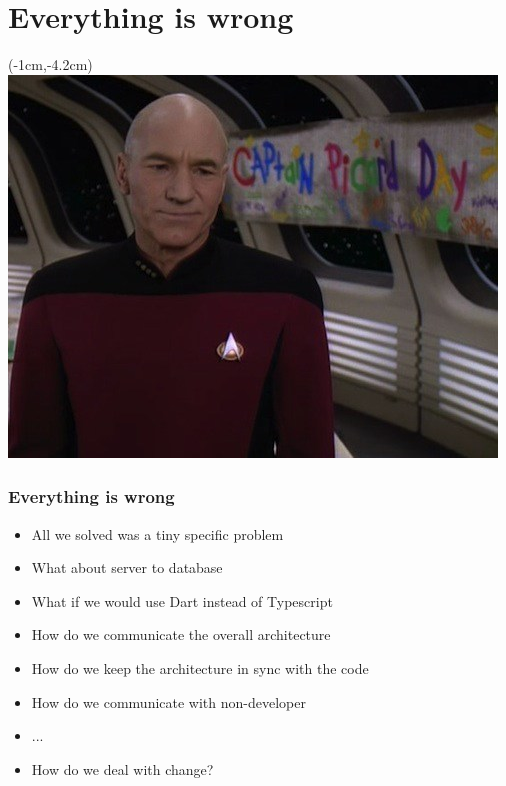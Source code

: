 \documentclass[xelatex,13pt]{beamer}
\begin{document}
\section{Everything is wrong}
\begin{frame}
\begin{textblock*}{0cm}(-1cm,-4.2cm)
	\includegraphics[width=1.0\paperwidth]{picarddday.jpg}
\end{textblock*}
\end{frame}

\begin{frame}
	\frametitle{Everything is wrong}
	\begin{itemize}
		\item All we solved was a tiny specific problem
		\item What about server to database
		\item What if we would use Dart instead of Typescript
		\item How do we communicate the overall architecture
		\item How do we keep the architecture in sync with the code
		\item How do we communicate with non-developer
		\item ...
		\pause
		\item {\huge How do we deal with change?}
	\end{itemize}
\end{frame}
\end{document}
